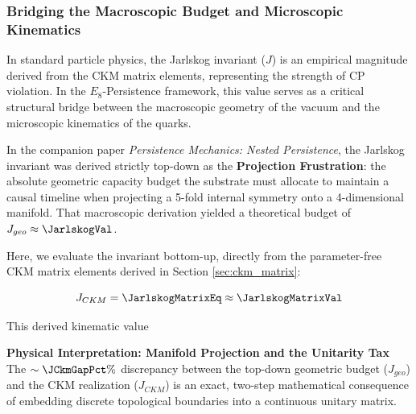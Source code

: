
\subsubsection{Bridging the Macroscopic Budget and Microscopic Kinematics}

In standard particle physics, the Jarlskog invariant ($J$) is an empirical magnitude derived from the CKM matrix elements, representing the strength of CP violation. In the $E_8$-Persistence framework, this value serves as a critical structural bridge between the macroscopic geometry of the vacuum and the microscopic kinematics of the quarks.

In the companion paper \textit{Persistence Mechanics: Nested Persistence}, the Jarlskog invariant was derived strictly top-down as the \textbf{Projection Frustration}: the absolute geometric capacity budget the substrate must allocate to maintain a causal timeline when projecting a 5-fold internal symmetry onto a 4-dimensional manifold. That macroscopic derivation yielded a theoretical budget of $J_{geo} \approx \mathbf{\JarlskogVal}$.

Here, we evaluate the invariant bottom-up, directly from the parameter-free CKM matrix elements derived in Section \cref{sec:ckm_matrix}:

\begin{equation}
    J_{CKM} = \JarlskogMatrixEq \approx \mathbf{\JarlskogMatrixVal}
\end{equation}

This derived kinematic value \JarlskogMatrixAccText

\vspace{1em}
\noindent\textbf{Physical Interpretation: Manifold Projection and the Unitarity Tax} \\
The $\sim \JCkmGapPct\%$ discrepancy between the top-down geometric budget ($J_{geo}$) and the CKM realization ($J_{CKM}$) is an exact, two-step mathematical consequence of embedding discrete topological boundaries into a continuous unitary matrix. 

